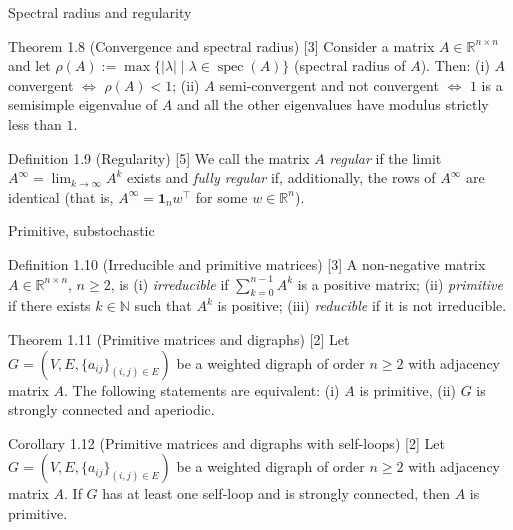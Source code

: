 \begin{frame}[label=bk-prelim-b]{Spectral radius and regularity}
  \scriptsize
  \begin{block}{Theorem 1.8 (Convergence and spectral radius) [3]}
    Consider a matrix $A \in \mathbb{R}^{n \times n}$ and let
    $\rho(A) := \max\{|\lambda| \mid \lambda \in \operatorname{spec}(A)\}$ (spectral radius
    of $A$). Then:
    (i) $A$ convergent $\iff$ $\rho(A) < 1$;
    (ii) $A$ semi-convergent and not convergent $\iff$ $1$ is a semisimple eigenvalue of
    $A$ and all the other eigenvalues have modulus strictly less than $1$.
  \end{block}
  \begin{block}{Definition 1.9 (Regularity) [5]}
    We call the matrix $A$ \emph{regular} if the limit $A^\infty = \lim_{k \to \infty} A^k$
    exists and \emph{fully regular} if, additionally, the rows of $A^\infty$ are identical
    (that is, $A^\infty = \mathbf{1}_n w^\top$ for some $w \in \mathbb{R}^n$).
  \end{block}
\end{frame}

\begin{frame}[label=bk-prelim2]{Primitive, substochastic}
  \scriptsize
  \begin{block}{Definition 1.10 (Irreducible and primitive matrices) [3]}
    A non-negative matrix $A \in \mathbb{R}^{n \times n}$, $n \geq 2$, is
    (i) \emph{irreducible} if $\sum_{k=0}^{n-1} A^k$ is a positive matrix;
    (ii) \emph{primitive} if there exists $k \in \mathbb{N}$ such that $A^k$ is positive;
    (iii) \emph{reducible} if it is not irreducible.
  \end{block}
  \begin{block}{Theorem 1.11 (Primitive matrices and digraphs) [2]}
    Let $G = (V, E, \{a_{ij}\}_{(i,j) \in E})$ be a weighted digraph of order $n \geq 2$
    with adjacency matrix $A$. The following statements are equivalent:
    (i) $A$ is primitive, (ii) $G$ is strongly connected and aperiodic.
  \end{block}
  \begin{block}{Corollary 1.12 (Primitive matrices and digraphs with self-loops) [2]}
    Let $G = (V, E, \{a_{ij}\}_{(i,j) \in E})$ be a weighted digraph of order $n \geq 2$
    with adjacency matrix $A$. If $G$ has at least one self-loop and is strongly connected,
    then $A$ is primitive.
  \end{block}
\end{frame}

